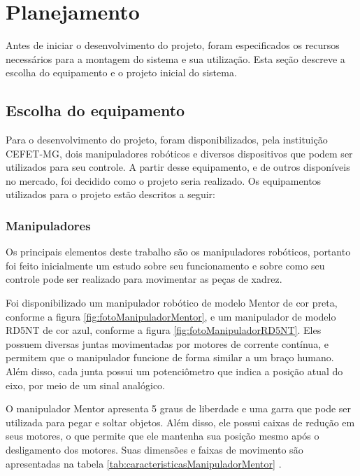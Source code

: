 \chapter[Planejamento]{Planejamento}
\label{cap:planejamento}

Antes de iniciar o desenvolvimento do projeto, foram especificados os recursos necessários para a montagem do sistema e sua utilização.
Esta seção descreve a escolha do equipamento e o projeto inicial do sistema.

\section[Escolha do equipamento]{Escolha do equipamento}
\label{sec:escolhaEquipamento}

Para o desenvolvimento do projeto, foram disponibilizados, pela instituição CEFET-MG, dois manipuladores robóticos e diversos dispositivos que podem ser utilizados para seu controle.
A partir desse equipamento, e de outros disponíveis no mercado, foi decidido como o projeto seria realizado.
Os equipamentos utilizados para o projeto estão descritos a seguir:

\subsection[Manipuladores]{Manipuladores}

Os principais elementos deste trabalho são os manipuladores robóticos, portanto foi feito inicialmente um estudo sobre seu funcionamento e sobre como seu controle pode ser realizado para movimentar as peças de xadrez.

Foi disponibilizado um manipulador robótico de modelo Mentor de cor preta, conforme a figura \ref{fig:fotoManipuladorMentor}, e um manipulador de modelo RD5NT de cor azul, conforme a figura \ref{fig:fotoManipuladorRD5NT}.
Eles possuem diversas juntas movimentadas por motores de corrente contínua, e permitem que o manipulador funcione de forma similar a um braço humano.
Além disso, cada junta possui um potenciômetro que indica a posição atual do eixo, por meio de um sinal analógico.

O manipulador Mentor apresenta 5 graus de liberdade e uma garra que pode ser utilizada para pegar e soltar objetos.
Além disso, ele possui caixas de redução em seus motores, o que permite que ele mantenha sua posição mesmo após o desligamento dos motores.
Suas dimensões e faixas de movimento são apresentadas na tabela \ref{tab:caracteristicasManipuladorMentor} \cite{mentor_forward_kinematics}.

